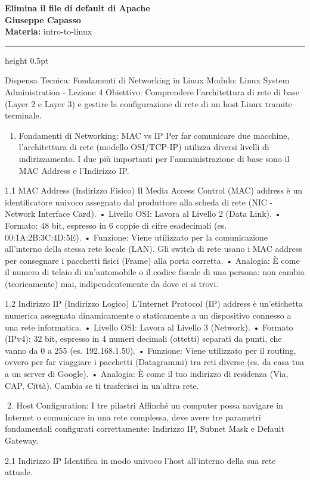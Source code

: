 \documentclass[11pt,a4paper]{article}
\providecommand{\tightlist}{%
  \setlength{\itemsep}{0pt}\setlength{\parskip}{0pt}}
\newcommand{\proposaltitle}[1]{
    \begin{center}
        \vspace*{0.1cm}
        {\LARGE \bfseries \color{blue} #1} \\[1.5ex]
        {\large \textbf{Giuseppe Capasso}} \\[1ex]
                \small{
            \vspace{0.1cm}
            \textbf{Materia:} intro-to-linux\\
        }
            \end{center}
    \vspace{0.3cm}
    \hrule height 0.5pt
    \vspace{0.5cm}
}
\begin{document}
\proposaltitle{Elimina il file di default di Apache}

Dispensa Tecnica: Fondamenti di Networking in Linux Modulo: Linux System
Administration - Lezione 4 Obiettivo: Comprendere l'architettura di rete
di base (Layer 2 e Layer 3) e gestire la configurazione di rete di un
host Linux tramite terminale.

\begin{enumerate}
\def\labelenumi{\arabic{enumi}.}
\tightlist
\item
  Fondamenti di Networking: MAC vs IP Per far comunicare due macchine,
  l'architettura di rete (modello OSI/TCP-IP) utilizza diversi livelli
  di indirizzamento. I due più importanti per l'amministrazione di base
  sono il MAC Address e l'Indirizzo IP.
\end{enumerate}

1.1 MAC Address (Indirizzo Fisico) Il Media Access Control (MAC) address
è un identificatore univoco assegnato dal produttore alla scheda di rete
(NIC - Network Interface Card). • Livello OSI: Lavora al Livello 2 (Data
Link). • Formato: 48 bit, espresso in 6 coppie di cifre esadecimali (es.
00:1A:2B:3C:4D:5E). • Funzione: Viene utilizzato per la comunicazione
all'interno della stessa rete locale (LAN). Gli switch di rete usano i
MAC address per consegnare i pacchetti fisici (Frame) alla porta
corretta. • Analogia: È come il numero di telaio di un'automobile o il
codice fiscale di una persona: non cambia (teoricamente) mai,
indipendentemente da dove ci si trovi.

1.2 Indirizzo IP (Indirizzo Logico) L'Internet Protocol (IP) address è
un'etichetta numerica assegnata dinamicamente o staticamente a un
dispositivo connesso a una rete informatica. • Livello OSI: Lavora al
Livello 3 (Network). • Formato (IPv4): 32 bit, espresso in 4 numeri
decimali (ottetti) separati da punti, che vanno da 0 a 255 (es.
192.168.1.50). • Funzione: Viene utilizzato per il routing, ovvero per
far viaggiare i pacchetti (Datagrammi) tra reti diverse (es. da casa tua
a un server di Google). • Analogia: È come il tuo indirizzo di residenza
(Via, CAP, Città). Cambia se ti trasferisci in un'altra rete.

2. Host Configuration: I tre pilastri Affinché un computer possa
navigare in Internet o comunicare in una rete complessa, deve avere tre
parametri fondamentali configurati correttamente: Indirizzo IP, Subnet
Mask e Default Gateway.

2.1 Indirizzo IP Identifica in modo univoco l'host all'interno della sua
rete attuale.
\end{document}
